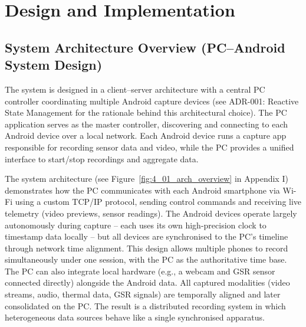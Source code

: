 \chapter{Design and Implementation}\label{chap:design-implementation}

\section{System Architecture Overview (PC--Android System Design)}\label{sec:4-1}
The system is designed in a client--server architecture with a central PC controller coordinating multiple Android capture devices (see ADR-001: Reactive State Management for the rationale behind this architectural choice). The PC application serves as the master controller, discovering and connecting to each Android device over a local network. Each Android device runs a capture app responsible for recording sensor data and video, while the PC provides a unified interface to start/stop recordings and aggregate data.

The system architecture (see Figure~\ref{fig:4_01_arch_overview} in Appendix I) demonstrates how the PC communicates with each Android smartphone via Wi-Fi using a custom TCP/IP protocol, sending control commands and receiving live telemetry (video previews, sensor readings). The Android devices operate largely autonomously during capture -- each uses its own high-precision clock to timestamp data locally -- but all devices are synchronised to the PC's timeline through network time alignment. This design allows multiple phones to record simultaneously under one session, with the PC as the authoritative time base. The PC can also integrate local hardware (e.g., a webcam and GSR sensor connected directly) alongside the Android data. All captured modalities (video streams, audio, thermal data, GSR signals) are temporally aligned and later consolidated on the PC. The result is a distributed recording system in which heterogeneous data sources behave like a single synchronised apparatus.

